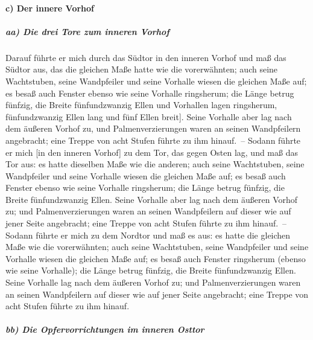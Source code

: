 \hypertarget{c-der-innere-vorhof}{%
\paragraph{c) Der innere Vorhof}\label{c-der-innere-vorhof}}

\hypertarget{aa-die-drei-tore-zum-inneren-vorhof}{%
\subparagraph{aa) Die drei Tore zum inneren
Vorhof}\label{aa-die-drei-tore-zum-inneren-vorhof}}

Darauf führte er mich durch das Südtor in den inneren
Vorhof und maß das Südtor aus, das die gleichen Maße hatte wie die
vorerwähnten; auch seine Wachtstuben, seine Wandpfeiler
und seine Vorhalle wiesen die gleichen Maße auf; es besaß auch Fenster
ebenso wie seine Vorhalle ringsherum; die Länge betrug fünfzig, die
Breite fünfundzwanzig Ellen \bibleverse{30}{[}und Vorhallen lagen
ringsherum, fünfundzwanzig Ellen lang und fünf Ellen breit{]}.
Seine Vorhalle aber lag nach dem äußeren Vorhof zu, und
Palmenverzierungen waren an seinen Wandpfeilern angebracht; eine Treppe
von acht Stufen führte zu ihm hinauf.~-- Sodann führte er
mich {[}in den inneren Vorhof{]} zu dem Tor, das gegen Osten lag, und
maß das Tor aus: es hatte dieselben Maße wie die anderen;
auch seine Wachtstuben, seine Wandpfeiler und seine
Vorhalle wiesen die gleichen Maße auf; es besaß auch Fenster ebenso wie
seine Vorhalle ringsherum; die Länge betrug fünfzig, die Breite
fünfundzwanzig Ellen. Seine Vorhalle aber lag nach dem
äußeren Vorhof zu; und Palmenverzierungen waren an seinen Wandpfeilern
auf dieser wie auf jener Seite angebracht; eine Treppe von acht Stufen
führte zu ihm hinauf.~-- Sodann führte er mich zu dem
Nordtor und maß es aus: es hatte die gleichen Maße wie die vorerwähnten;
auch seine Wachtstuben, seine Wandpfeiler und seine
Vorhalle wiesen die gleichen Maße auf; es besaß auch Fenster ringsherum
(ebenso wie seine Vorhalle); die Länge betrug fünfzig, die Breite
fünfundzwanzig Ellen. Seine Vorhalle lag nach dem äußeren
Vorhof zu; und Palmenverzierungen waren an seinen Wandpfeilern auf
dieser wie auf jener Seite angebracht; eine Treppe von acht Stufen
führte zu ihm hinauf.

\hypertarget{bb-die-opfervorrichtungen-im-inneren-osttor}{%
\subparagraph{bb) Die Opfervorrichtungen im inneren
Osttor}\label{bb-die-opfervorrichtungen-im-inneren-osttor}}


